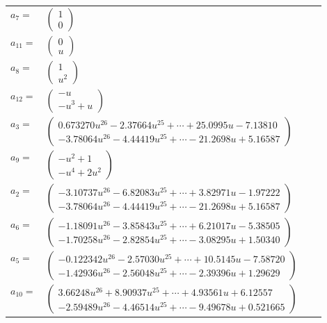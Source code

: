 \documentclass[1p]{elsarticle_modified}
\theoremstyle{definition}
\begin{document}
\begin{tabular}{m{7pt} m{180pt} m{7pt} m{180pt} }
\flushright $a_{7}=$&$\begin{pmatrix}1\\0\end{pmatrix}$ \\
\flushright $a_{11}=$&$\begin{pmatrix}0\\u\end{pmatrix}$ \\
\flushright $a_{8}=$&$\begin{pmatrix}1\\u^2\end{pmatrix}$ \\
\flushright $a_{12}=$&$\begin{pmatrix}- u\\- u^3+u\end{pmatrix}$ \\
\flushright $a_{3}=$&$\begin{pmatrix}0.673270 u^{26}-2.37664 u^{25}+\cdots+25.0995 u-7.13810\\-3.78064 u^{26}-4.44419 u^{25}+\cdots-21.2698 u+5.16587\end{pmatrix}$ \\
\flushright $a_{9}=$&$\begin{pmatrix}- u^2+1\\- u^4+2 u^2\end{pmatrix}$ \\
\flushright $a_{2}=$&$\begin{pmatrix}-3.10737 u^{26}-6.82083 u^{25}+\cdots+3.82971 u-1.97222\\-3.78064 u^{26}-4.44419 u^{25}+\cdots-21.2698 u+5.16587\end{pmatrix}$ \\
\flushright $a_{6}=$&$\begin{pmatrix}-1.18091 u^{26}-3.85843 u^{25}+\cdots+6.21017 u-5.38505\\-1.70258 u^{26}-2.82854 u^{25}+\cdots-3.08295 u+1.50340\end{pmatrix}$ \\
\flushright $a_{5}=$&$\begin{pmatrix}-0.122342 u^{26}-2.57030 u^{25}+\cdots+10.5145 u-7.58720\\-1.42936 u^{26}-2.56048 u^{25}+\cdots-2.39396 u+1.29629\end{pmatrix}$ \\
\flushright $a_{10}=$&$\begin{pmatrix}3.66248 u^{26}+8.90937 u^{25}+\cdots+4.93561 u+6.12557\\-2.59489 u^{26}-4.46514 u^{25}+\cdots-9.49678 u+0.521665\end{pmatrix}$ \\

\end{tabular}
\end{document}
